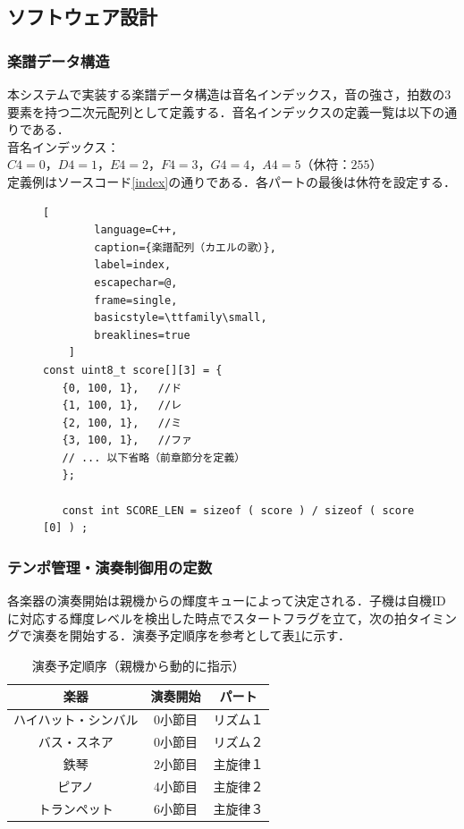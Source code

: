 \documentclass[lualatex,book,paper=a4paper,jafontsize=11.5pt,jafontscale=1.05,oneside]{jlreq}
\begin{document}
\subsection{ソフトウェア設計}


\subsubsection{楽譜データ構造}
本システムで実装する楽譜データ構造は音名インデックス，音の強さ，拍数の3要素を持つ二次元配列として定義する．音名インデックスの定義一覧は以下の通りである．\\

音名インデックス：$C4=0，D4=1，E4=2，F4=3，G4=4，A4=5（休符：255）$\\

定義例はソースコード\ref{index}の通りである．各パートの最後は休符を設定する．

\begin{figure}[H]
\renewcommand{\lstlistingname}{ソースコード}
    \begin{lstlisting}[
        language=C++,
        caption={楽譜配列（カエルの歌）},
        label=index,
        escapechar=@,
        frame=single,
        basicstyle=\ttfamily\small,
        breaklines=true
    ]
const uint8_t score[][3] = {
   {0, 100, 1},   //ド
   {1, 100, 1},   //レ
   {2, 100, 1},   //ミ
   {3, 100, 1},   //ファ
   // ... 以下省略（前章節分を定義）
   };
   
   const int SCORE_LEN = sizeof ( score ) / sizeof ( score [0] ) ;

   \end{lstlisting}
\end{figure}

\subsubsection{テンポ管理・演奏制御用の定数}
各楽器の演奏開始は親機からの輝度キューによって決定される．子機は自機IDに対応する輝度レベルを検出した時点でスタートフラグを立て，次の拍タイミングで演奏を開始する．演奏予定順序を参考として表\ref{offset02}に示す．
\begin{table}[H]
  \centering
  \caption{演奏予定順序（親機から動的に指示）}
  \label{offset02}
  \begin{tabular}{|c|c|c|}
\hline
楽器 & 演奏開始 & パート \\\hline \hline
ハイハット・シンバル & 0小節目 & リズム１ \\ \hline
バス・スネア & 0小節目 & リズム２ \\ \hline
鉄琴 & 2小節目 & 主旋律１ \\ \hline
ピアノ & 4小節目 & 主旋律２ \\ \hline
トランペット & 6小節目 & 主旋律３ \\ \hline
  \end{tabular}  
\end{table}
\FloatBarrier
\end{document}
